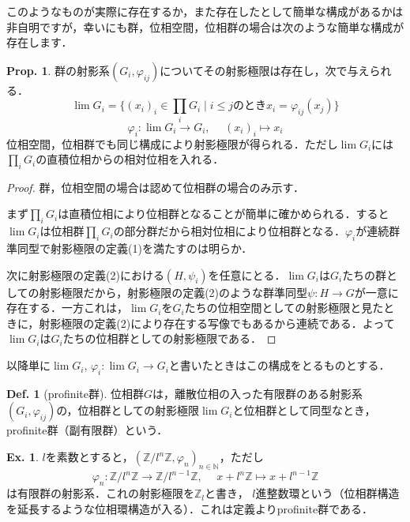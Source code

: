 \documentclass[dvipdfmx,b5paper,papersize]{jsarticle}
\theoremstyle{definition}
\newtheorem{prop}[thm]{Prop.}
\newtheorem{defi}[thm]{Def.}
\newtheorem{ex}[thm]{Ex.}
\begin{document}
このようなものが実際に存在するか，また存在したとして簡単な構成があるかは非自明ですが，幸いにも群，位相空間，位相群の場合は次のような簡単な構成が存在します．
\begin{prop}
  群の射影系$(G_i, \varphi_{ij})$についてその射影極限は存在し，次で与えられる．
  \[
  \lim G_i=\{(x_i)_i \in \prod_i G_i \mid \text{$i \leq j$のとき$x_i = \varphi_{ij}(x_j)$}\}
  \]
  \[
  \varphi_i \colon \lim G_i \to G_i,\hspace{15pt} (x_i)_i \mapsto x_i
  \]
  位相空間，位相群でも同じ構成により射影極限が得られる．ただし$\lim G_i$には$\prod_i G_i$の直積位相からの相対位相を入れる．
\end{prop}
\begin{proof}
  群，位相空間の場合は認めて位相群の場合のみ示す．

  まず$\prod_i G_i$は直積位相により位相群となることが簡単に確かめられる．すると$\lim G_i$は位相群$\prod_i G_i$の部分群だから相対位相により位相群となる．$\varphi_i$が連続群準同型で射影極限の定義(1)を満たすのは明らか．

  次に射影極限の定義(2)における$(H, \psi_i)$を任意にとる．$\lim G_i$は$G_i$たちの群としての射影極限だから，射影極限の定義(2)のような群準同型$\psi \colon H \to G$が一意に存在する．一方これは，$\lim G_i$を$G_i$たちの位相空間としての射影極限と見たときに，射影極限の定義(2)により存在する写像でもあるから連続である．よって$\lim G_i$は$G_i$たちの位相群としての射影極限である．
\end{proof}
以降単に$\lim G_i$, $\varphi_i \colon \lim G_i \to G_i$と書いたときはこの構成をとるものとする．
\begin{defi}[profinite群]
  位相群$G$は，離散位相の入った有限群のある射影系$(G_i, \varphi_{ij})$の，位相群としての射影極限$\lim G_i$と位相群として同型なとき，profinite群（副有限群）という．
\end{defi}

\begin{ex}\label{thm:l-adic_integer_ring}
  $l$を素数とすると，$(\mathbb{Z}/l^n\mathbb{Z}, \varphi_n)_{n \in \mathbb{N}}$，ただし
  \[
    \varphi_n \colon \mathbb{Z}/l^n\mathbb{Z} \to \mathbb{Z}/l^{n-1}\mathbb{Z},\hspace{15pt} x+l^n\mathbb{Z} \mapsto x+l^{n-1}\mathbb{Z}
  \]
  は有限群の射影系．これの射影極限を$\mathbb{Z}_l$と書き，
$l$進整数環という（位相群構造を延長するような位相環構造が入る）．これは定義よりprofinite群である．
\end{ex}
\end{document}
